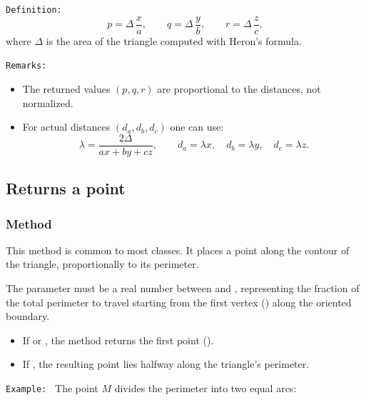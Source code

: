 \texttt{Definition: }
\[
p = \Delta\,\frac{x}{a}, \qquad
q = \Delta\,\frac{y}{b}, \qquad
r = \Delta\,\frac{z}{c},
\]
where \(\Delta\) is the area of the triangle computed with Heron’s formula.

\medskip
\texttt{Remarks: }
\begin{itemize}
  \item The returned values \((p,q,r)\) are proportional to the distances, not normalized.
  \item For actual distances \((d_a,d_b,d_c)\) one can use:
  \[
    \lambda = \frac{2\Delta}{ax + by + cz}, \qquad
    d_a = \lambda x,\quad d_b = \lambda y,\quad d_c = \lambda z.
  \]
\end{itemize}




\subsection{Returns  a point}

\subsubsection{Method }
\label{ssub:method_triangle_point_r}

This method is common to most classes. It places a point along the contour of the triangle, proportionally to its perimeter.

\medskip

The parameter  must be a real number between  and , representing the fraction of the total perimeter to travel starting from the first vertex () along the oriented boundary.

\begin{itemize}
  \item If  or , the method returns the first point ().
  \item If , the resulting point lies halfway along the triangle’s perimeter.
\end{itemize}

\medskip

\texttt{Example: } The point $M$ divides the perimeter into two equal arcs:
\begin{center}
\end{center}

